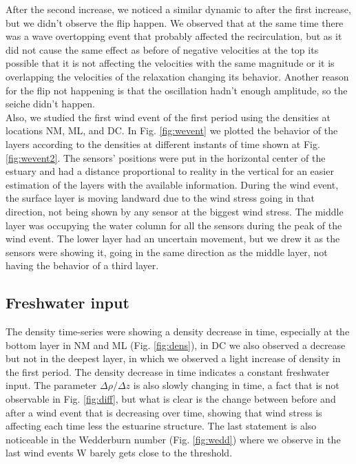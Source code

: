 \documentclass[tesis.tex]{subfiles}
\begin{document}
After the second increase, we noticed a similar dynamic to after the first increase, but we didn't observe the flip happen. We observed that at the same time there was a wave overtopping event that probably affected the recirculation, but as it did not cause the same effect as before of negative velocities at the top its possible that it is not affecting the velocities with the same magnitude or it is overlapping the velocities of the relaxation changing its behavior. Another reason for the flip not happening is that the oscillation hadn't enough amplitude, so the seiche didn't happen.\\

Also, we studied the first wind event of the first period using the densities at locations NM, ML, and DC. In Fig. \ref{fig:wevent} we plotted the behavior of the layers according to the densities at different instants of time shown at Fig. \ref{fig:wevent2}. The sensors' positions were put in the horizontal center of the estuary and had a distance proportional to reality in the vertical for an easier estimation of the layers with the available information. During the wind event, the surface layer is moving landward due to the wind stress going in that direction, not being shown by any sensor at the biggest wind stress. The middle layer was occupying the water column for all the sensors during the peak of the wind event. The lower layer had an uncertain movement, but we drew it as the sensors were showing it, going in the same direction as the middle layer, not having the behavior of a third layer.\\

\subsection{Freshwater input}

The density time-series were showing a density decrease in time, especially at the bottom layer in NM and ML (Fig. \ref{fig:dens}), in DC we also observed a decrease but not in the deepest layer, in which we observed a light increase of density in the first period. The density decrease in time indicates a constant freshwater input. The parameter $\Delta \rho / \Delta z$ is also slowly changing in time, a fact that is not observable in Fig. \ref{fig:diff}, but what is clear is the change between before and after a wind event that is decreasing over time, showing that wind stress is affecting each time less the estuarine structure. The last statement is also noticeable in the Wedderburn number (Fig. \ref{fig:wedd}) where we observe in the last wind events W barely gets close to the threshold.\\
\end{document}

